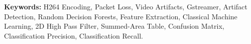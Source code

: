 \bigskip

\textbf{Keywords:} H264 Encoding, Packet Loss, Video Artifacts, Gstreamer,  Artifact Detection, Random Decision Forests, Feature Extraction, Classical Machine Learning, 2D High Pass Filter, Summed-Area Table, Confusion Matrix, Classification Precision, Classification Recall.

\cleardoublepage

